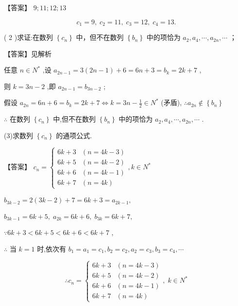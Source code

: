 \documentclass[10pt]{article}
\newcommand*\circled[1]{\tikz[baseline=(char.base)]{\node[shape=circle,draw,inner sep=1.5pt] (char) {\small #1};}}
\begin{document}
【答案】 \(9;{11};{12};{13}\)

\[
{c}_{1} = 9,\;{c}_{2} = {11},\;{c}_{3} = {12},\;{c}_{4} = {13}.
\]

( 2 )求证:在数列 \(\left\{  {c}_{n}\right\}\) 中，但不在数列 \(\left\{  {b}_{n}\right\}\) 中的项恰为 \({a}_{2},{a}_{4},\cdots ,{a}_{2n},\cdots\) ；

【答案】见解析

 \circled{1}  任意 \(n \in  {N}^{ * }\) ,设 \({a}_{{2n} - 1} = 3\left( {{2n} - 1}\right)  + 6 = {6n} + 3 = {b}_{k} = {2k} + 7\) ,

则 \(k = {3n} - 2\) ,即 \({a}_{{2n} - 1} = {b}_{{3n} - 2}\) ;

 \circled{2}  假设 \({a}_{2n} = {6n} + 6 = {b}_{k} = {2k} + 7 \Leftrightarrow  k = {3n} - \frac{1}{2} \in  {N}^{ * }\) (矛盾), \(\therefore {a}_{2n} \notin  \left\{  {b}_{n}\right\}\)

\(\therefore\) 在数列 \(\left\{  {c}_{n}\right\}\) 中,但不在数列 \(\left\{  {b}_{n}\right\}\) 中的项恰为 \({a}_{2},{a}_{4},\cdots ,{a}_{2n},\cdots\) .

(3)求数列 \(\left\{  {c}_{n}\right\}\) 的通项公式.

【答案】 \({c}_{n} = \left\{  {\begin{array}{ll} {6k} + 3 & \left( {n = {4k} - 3}\right) \\  {6k} + 5 & \left( {n = {4k} - 2}\right) \\  {6k} + 6 & \left( {n = {4k} - 1}\right) \\  {6k} + 7 & \left( {n = {4k}}\right)  \end{array},k \in  {N}^{ * }}\right.\)

\({b}_{{3k} - 2} = 2\left( {{3k} - 2}\right)  + 7 = {6k} + 3 = {a}_{{2k} - 1},\)

\({b}_{{3k} - 1} = {6k} + 5,\;{a}_{2k} = {6k} + 6,\;{b}_{3k} = {6k} + 7,\)

\(\because {6k} + 3 < {6k} + 5 < {6k} + 6 < {6k} + 7\) ,

\(\therefore\) 当 \(k = 1\) 时,依次有 \({b}_{1} = {a}_{1} = {c}_{1},{b}_{2} = {c}_{2},{a}_{2} = {c}_{3},{b}_{3} = {c}_{4},\cdots\)

\[
\therefore {c}_{n} = \left\{  {\begin{array}{ll} {6k} + 3 & \left( {n = {4k} - 3}\right) \\  {6k} + 5 & \left( {n = {4k} - 2}\right) \\  {6k} + 6 & \left( {n = {4k} - 1}\right) \\  {6k} + 7 & \left( {n = {4k}}\right)  \end{array},\;k \in  {N}^{ * }}\right.
\]
\end{document}
